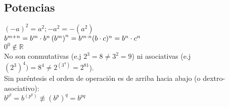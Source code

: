 \subsection{Potencias}
$ (-a)^2 = a^2; -a^2 = -(a^2)$\\
$b^{m + n} = b^m \cdot b^n \\
\left(b^m\right)^n = b^{m \cdot n} \\
(b \cdot c)^n = b^n \cdot c^n$\\
$ 0^0 \notin \mathbb{R}$\\

No son conmutativas (e.j $2^3 = 8 \neq 3^2 = 9$) ni asociativas (e.j $(2^3)^4) = 8^4 \neq 2^{(3^4)} = 2^{81}$).\\

Sin paréntesis el orden de operación es de arriba hacia abajo (o dextro-asociativo):\\
$b^{p^q} = b^{\left(p^q\right)} \not\equiv \left(b^p\right)^q = b^{p q}$\\
